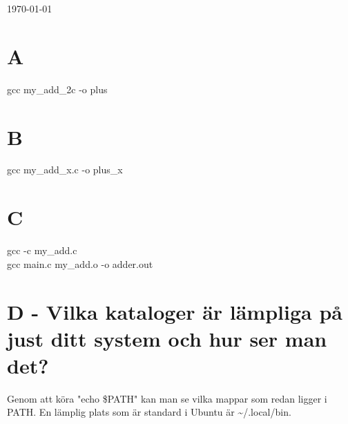 \documentclass[11pt]{article}
\begin{document}
\begin{titlepage}

	\vfill\vfill\vfill %

	{\large\today} %




	\vfill %

\end{titlepage}


\section*{A}
gcc my\_add\_2c -o plus

\section*{B}
gcc my\_add\_x.c -o plus\_x

\section*{C}
gcc -c my\_add.c\\
gcc main.c my\_add.o -o adder.out

\section*{D - Vilka kataloger är lämpliga på just ditt system och hur ser man det?}
Genom att köra "echo \$PATH" kan man se vilka mappar som redan ligger i PATH. En lämplig plats som är standard i Ubuntu är \textasciitilde/.local/bin. 
\end{document}
